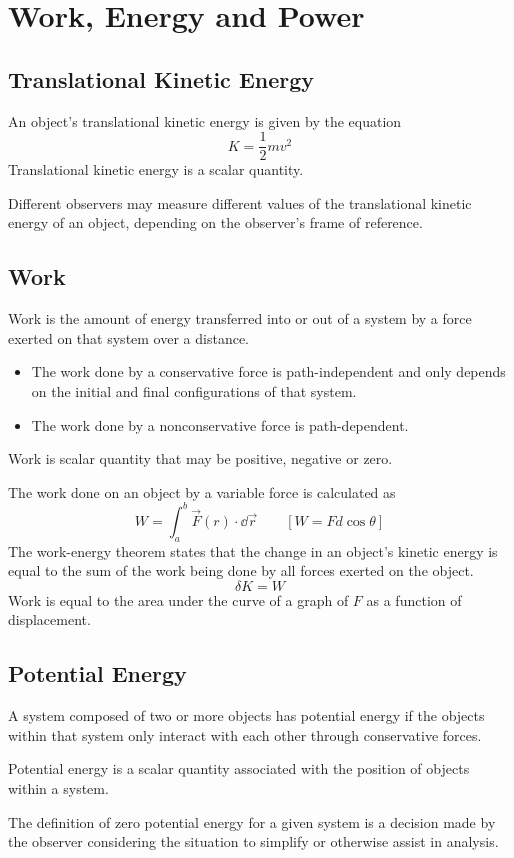 \documentclass[../mech.tex]{subfiles}
\begin{document}
\chapter{Work, Energy and Power}
\section{Translational Kinetic Energy}
An object's translational kinetic energy is given by the equation 
\[ K=\frac{1}{2}mv^2 \]
Translational kinetic energy is a scalar quantity.

Different observers may measure different values of the translational kinetic energy of an object, depending on the observer's frame of reference.
\section{Work}
Work is the amount of energy transferred into or out of a system by a force exerted on that system over a distance.
\begin{itemize}
    \item The work done by a conservative force is path-independent and only depends on the initial and final configurations of that system.
    \item The work done by a nonconservative force is path-dependent.
\end{itemize}

Work is scalar quantity that may be positive, negative or zero.

The work done on an object by a variable force is calculated as 
\[ W=\int_a^b \vec{F}(r)\cdot \dd \vec{r} \qquad [W=Fd\cos\theta] \]
The work-energy theorem states that the change in an object's kinetic energy is equal to the sum of the work being done by all forces exerted on the object.
\[ \delta K = W \]
Work is equal to the area under the curve of a graph of $F$ as a function of displacement.

\section{Potential Energy}
A system composed of two or more objects has potential energy if the objects within that system only interact with each other through conservative forces.

Potential energy is a scalar quantity associated with the position of objects within a system.

The definition of zero potential energy for a given system is a decision made by the observer considering the situation to simplify or otherwise assist in analysis.
\end{document}
